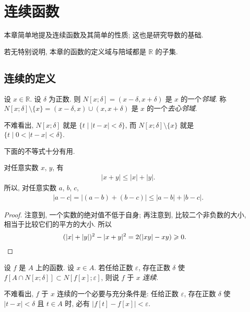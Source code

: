 \chapter{连续函数}

本章简单地提及连续函数及其简单的性质; 这也是研究导数的基础.

若无特别说明, 本章的函数的定义域与陪域都是 $\mathbb{R}$ 的子集.

\section{连续的定义}

\begin{definition}
    设 $x \in \mathbb{R}$. 设 $\delta$ 为正数. 则 $N[x; \delta] = (x - \delta, x + \delta)$ 是 $x$ 的一个\emph{邻域}. 称 $N[x; \delta] \setminus \{ x \} = (x - \delta, x) \cup (x, x + \delta)$ 是 $x$ 的一个\emph{去心邻域}.
\end{definition}

不难看出, $N[x; \delta]$ 就是 $\{ t \mid |t - x| < \delta \}$, 而 $N[x; \delta] \setminus \{ x \}$ 就是 $\{ t \mid 0 < |t - x| < \delta \}$.

下面的不等式十分有用.

\begin{theorem}
    对任意实数 $x$, $y$, 有
    \begin{align*}
        |x + y| \leq |x| + |y|.
    \end{align*}
    所以, 对任意实数 $a$, $b$, $c$,
    \begin{align*}
        |a - c| = |(a - b) + (b - c)| \leq |a - b| + |b - c|.
    \end{align*}
\end{theorem}

\begin{proof}
    注意到, 一个实数的绝对值不低于自身; 再注意到, 比较二个非负数的大小, 相当于比较它们的平方的大小. 所以
    \begin{align*}
         & {(|x| + |y|)^2 - |x + y|^2 = 2(|xy| - xy) \geq 0.} \qedhere
    \end{align*}
\end{proof}

\begin{definition}
    设 $f$ 是 $A$ 上的函数. 设 $x \in A$. 若任给正数 $\varepsilon$, 存在正数 $\delta$ 使 $f[A \cap N[x; \delta]] \subset N[f[x]; \varepsilon]$, 则说 $f$ 于 $x$ \emph{连续}.
\end{definition}

不难看出, $f$ 于 $x$ 连续的一个必要与充分条件是: 任给正数 $\varepsilon$, 存在正数 $\delta$ 使 $|t - x| < \delta$ 且 $t \in A$ 时, 必有 $|f[t] - f[x]| < \varepsilon$.

